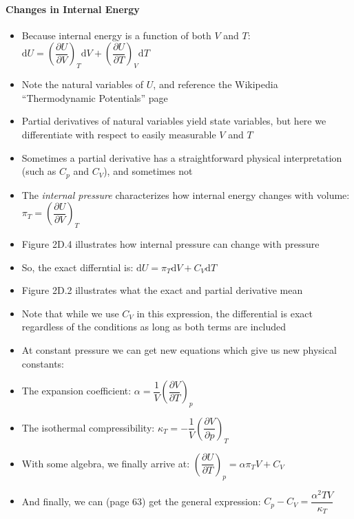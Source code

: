\documentclass[12pt, openany, letterpaper]{memoir}
\begin{document}
\paragraph{Changes in Internal Energy}
\begin{itemize}
	\item Because internal energy is a function of both $V$ and $T$: $\mathrm{d}U = \left(\dfrac{\partial U}{\partial V}\right)_T\mathrm{d}V + \left(\dfrac{\partial U}{\partial T}\right)_V\mathrm{d}T$
	\item Note the natural variables of $U$, and reference the Wikipedia ``Thermodynamic Potentials'' page
	\item Partial derivatives of natural variables yield state variables, but here we differentiate with respect to easily measurable $V$ and $T$
	\item Sometimes a partial derivative has a straightforward physical interpretation (such as $C_p$ and $C_V$), and sometimes not
	\item The \emph{internal pressure} characterizes how internal energy changes with volume: $\pi_T = \left(\dfrac{\partial U}{\partial V}\right)_T$
	\item Figure 2D.4 illustrates how internal pressure can change with pressure
	\item So, the exact differntial is: $\mathrm{d}U = \pi_T\mathrm{d}V + C_V\mathrm{d}T$
	\item Figure 2D.2 illustrates what the exact and partial derivative mean
	\item Note that while we use $C_V$ in this expression, the differential is exact regardless of the conditions as long as both terms are included
	\item At constant pressure we can get new equations which give us new physical constants:
	\item The expansion coefficient: $\alpha = \dfrac{1}{V}\left(\dfrac{\partial V}{\partial T}\right)_p$
	\item The isothermal compressibility: $\kappa_T = -\dfrac{1}{V}\left(\dfrac{\partial V}{\partial p}\right)_T$
	\item With some algebra, we finally arrive at: $\left(\dfrac{\partial U}{\partial T}\right)_p = \alpha\pi_T V + C_V$
	\item And finally, we can (page 63) get the general expression: $C_p-C_V = \dfrac{\alpha^2 TV}{\kappa_T}$
\end{itemize}
\end{document}
